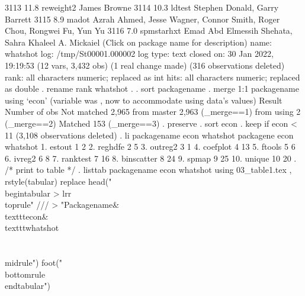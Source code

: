   3113     11.8    reweight2     James Browne                            
  3114     10.3    ldtest        Stephen Donald, Garry Barrett           
  3115      8.9    madot         Azrah Ahmed, Jesse Wagner, Connor       
                                   Smith, Roger Chou, Rongwei Fu, Yun Yu   
  3116      7.0    spmstarhxt    Emad Abd Elmessih Shehata, Sahra        
                                   Khaleel A. Mickaiel                     
  (Click on package name for description)
      name:  whatshot
       log:  /tmp/St00001.000002
  log type:  text
 closed on:  30 Jan 2022, 19:19:53
(12 vars, 3,432 obs)
(1 real change made)
(316 observations deleted)
rank: all characters numeric; replaced as int
hits: all characters numeric; replaced as double
{\smallskip}
. rename rank whatshot
{\smallskip}
. 
. sort packagename
{\smallskip}
. merge 1:1 packagename using `econ'
(variable {} was {}, now {} to accommodate using data's values)
{\smallskip}
    Result                      Number of obs
    Not matched                         2,965
        from master                     2,963  (_merge==1)
        from using                          2  (_merge==2)
{\smallskip}
    Matched                               153  (_merge==3)
{\smallskip}
. preserve
{\smallskip}
. sort econ
{\smallskip}
. keep if econ < 11
(3,108 observations deleted)
{\smallskip}
. li packagename econ whatshot
{\smallskip}
     {\TLC}
     {\VBAR} packagen{\tytilde}e   econ   whatshot {\VBAR}
     {\LFTT}
  1. {\VBAR}     estout      1          2 {\VBAR}
  2. {\VBAR}    reghdfe      2          5 {\VBAR}
  3. {\VBAR}    outreg2      3          1 {\VBAR}
  4. {\VBAR}   coefplot      4         13 {\VBAR}
  5. {\VBAR}     ftools      5          6 {\VBAR}
     {\LFTT}
  6. {\VBAR}     ivreg2      6          8 {\VBAR}
  7. {\VBAR}   ranktest      7         16 {\VBAR}
  8. {\VBAR} binscatter      8         24 {\VBAR}
  9. {\VBAR}      spmap      9         25 {\VBAR}
 10. {\VBAR}     unique     10         20 {\VBAR}
     {\BLC}
{\smallskip}
. /* print to table */
. listtab packagename  econ whatshot using 03_table1.tex , rstyle(tabular) replace head("\\begin{\lbr}tabular
> {\rbr}{\lbr}lrr{\rbr}\\toprule" ///
>             "Packagename\&\\texttt{\lbr}econ{\rbr}\&\\texttt{\lbr}whatshot{\rbr}\\\\\\midrule") foot("\\bottomrule\\end{\lbr}tabular{\rbr}")
